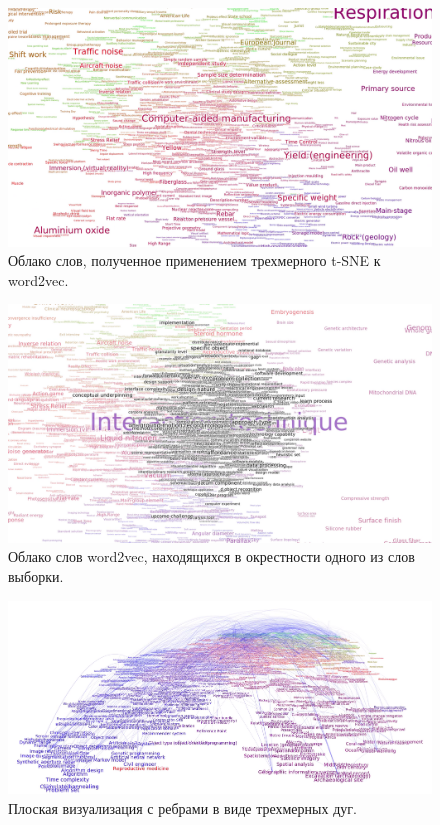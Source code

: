 \begin{figure}[h]
  \centering
  \includegraphics[width=\textwidth]{shots/cloud.png}
  \caption{Облако слов, полученное применением трехмерного t-SNE к word2vec.}
\end{figure}

\begin{figure}[h]
  \centering
  \includegraphics[width=\textwidth]{shots/local.png}
  \caption{Облако слов word2vec, находящихся в окрестности одного из слов выборки.}
\end{figure}

\begin{figure}[h]
  \centering
  \includegraphics[width=\textwidth]{shots/3dgraph.png}
  \caption{Плоская визуализация с ребрами в виде трехмерных дуг.}
\end{figure}

